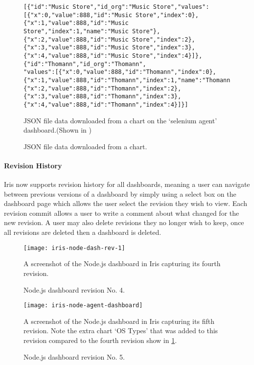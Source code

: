 \documentclass[12pt,a4paper,titlepage]{report}
\begin{document}
\begin{figure}[H]
\begin{tcolorbox}
\begin{verbatim}
[{"id":"Music Store","id_org":"Music Store","values":[{"x":0,"value":888,"id":"Music Store","index":0},{"x":1,"value":888,"id":"Music Store","index":1,"name":"Music Store"},{"x":2,"value":888,"id":"Music Store","index":2},{"x":3,"value":888,"id":"Music Store","index":3},{"x":4,"value":888,"id":"Music Store","index":4}]},{"id":"Thomann","id_org":"Thomann",
"values":[{"x":0,"value":888,"id":"Thomann","index":0},
{"x":1,"value":888,"id":"Thomann","index":1,"name":"Thomann"},
{"x":2,"value":888,"id":"Thomann","index":2},
{"x":3,"value":888,"id":"Thomann","index":3},
{"x":4,"value":888,"id":"Thomann","index":4}]}]
\end{verbatim}
JSON file data downloaded from a chart on the  `selenium agent' dashboard.(Shown in )
\end{tcolorbox}
\caption{JSON file data downloaded from a chart.}
\end{figure}

\paragraph{Revision History}

Iris now supports revision history for all dashboards, meaning a user can navigate between previous versions of a dashboard by simply using a select box on the dashboard page which allows the user select the revision they wish to view. Each revision commit allows a user to write a comment about what changed for the new revision. A user may also delete revisions they no longer wish to keep, once all revisions are deleted then a dashboard is deleted.
\begin{figure}[H]
\begin{tcolorbox}
\begin{center}
\texttt{[image: iris-node-dash-rev-1]}
\end{center}
A screenshot of the Node.js dashboard in Iris capturing its fourth revision.
\end{tcolorbox}
\caption{Node.js dashboard revision No. 4.}
\label{fig:dash:rev:4}
\end{figure}
\begin{figure}[H]
\begin{tcolorbox}
\begin{center}
\texttt{[image: iris-node-agent-dashboard]}
\end{center}
A screenshot of the Node.js dashboard in Iris capturing its fifth revision. Note the extra chart `OS Types' that was added to this revision compared to the fourth revision show in \cref{fig:dash:rev:4}.
\end{tcolorbox}
\caption{Node.js dashboard revision No. 5.}
\end{figure}
\end{document}
